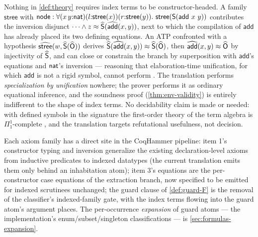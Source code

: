 \begin{remark}
\label{rem:slime}
Nothing in \cref{def:theory} requires index terms to be
constructor-headed.  A family $\mathsf{stree}$ with $\mathsf{node} :
\forall (x\,y{:}\mathsf{nat})(l{:}\mathsf{stree}(x))(r{:}\mathsf{stree}(y)).\
\mathsf{stree}(\mathsf{S}(\mathsf{add}\ x\ y))$ contributes the inversion
disjunct $\dots \wedge z \approx
\widehat{\mathsf{S}}(\widehat{\mathsf{add}}(x,y))$, next to which the compilation
of $\mathsf{add}$ has already placed its two defining equations.  An
ATP confronted with a hypothesis $\widehat{\mathsf{stree}}(w,
\widehat{\mathsf{S}}(\widehat{\mathsf{O}}))$ derives $\widehat{\mathsf{S}}(\widehat{\mathsf{add}}(x,y))
\approx \widehat{\mathsf{S}}(\widehat{\mathsf{O}})$, then $\widehat{\mathsf{add}}(x,y) \approx
\widehat{\mathsf{O}}$ by injectivity of $\widehat{\mathsf{S}}$, and can close or constrain
the branch by superposition with $\mathsf{add}$'s equations and $\mathsf{nat}$'s
inversion --- reasoning that elaboration-time unification, for which
$\mathsf{add}$ is not a rigid symbol, cannot perform
\cite{McBride2014,GoguenEtAl2006}.  The translation performs
\emph{specialization by unification} nowhere; the prover performs it as
ordinary equational inference, and the soundness proof
(\cref{thm:env-validity}) is entirely indifferent to the shape of index
terms.  No decidability claim is made or needed: with defined symbols
in the signature the first-order theory of the term algebra is
$\Pi^1_1$-complete \cite[Thm.~2]{KovacsEtAl2017}, and the translation
targets refutational usefulness, not decision.
\end{remark}

\begin{remark}
\label{rem:impl-sites}
Each axiom family has a direct site in the CoqHammer pipeline: item 1's
constructor typing and inversion generalize the existing
declaration-level axioms from inductive predicates to indexed datatypes
(the current translation emits them only behind an inhabitation atom);
item 3's equations are the per-constructor case equations of the
extraction branch, now specified to be emitted for indexed scrutinees
unchanged; the guard clause of \cref{def:guard-F} is the removal of the
classifier's indexed-family gate, with the index terms flowing into the
guard atom's argument places.  The per-occurrence \emph{expansion} of
guard atoms --- the implementation's enum/subset/singleton
classifications --- is \cref{sec:formulas-expansion}.
\end{remark}
